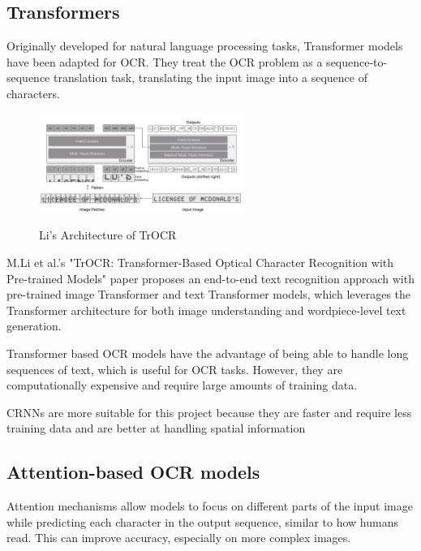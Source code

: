 \newpage

\subsection{Transformers}

Originally developed for natural language processing tasks, Transformer models have been adapted for OCR. They treat the OCR problem as a sequence-to-sequence translation task, translating the input image into a sequence of characters.

\begin{figure}[ht]
    \centering
    \includegraphics[width=0.6\textwidth]{Figures/Trans_MLi.jpg}
    \caption[Li's Architecture of TrOCR]{Li's Architecture of TrOCR}\cite{liTrOCRTransformerBasedOptical2023}
    \label{fig:Li's Architecture of TrOCR}
\end{figure}

M.Li et al.'s "TrOCR: Transformer-Based Optical Character Recognition with Pre-trained Models" paper proposes an end-to-end text recognition approach with pre-trained image Transformer and text Transformer models, which leverages the Transformer architecture for both image understanding and wordpiece-level text generation. \cite{liTrOCRTransformerBasedOptical2023}

Transformer based OCR models have the advantage of being able to handle long sequences of text, which is useful for OCR tasks. However, they are computationally expensive and require large amounts of training data.

CRNNs are more suitable for this project because they are faster and require less training data and are better at handling spatial information

\newpage

\subsection{Attention-based OCR models}

Attention mechanisms allow models to focus on different parts of the input image while predicting each character in the output sequence, similar to how humans read. This can improve accuracy, especially on more complex images.

